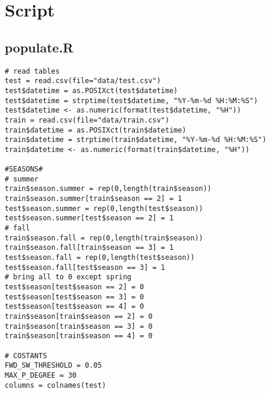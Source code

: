 \section{Script}\label{sec:script}

\subsection{populate.R}\label{sec:script-populate}
\begin{verbatim}
# read tables
test = read.csv(file="data/test.csv")
test$datetime = as.POSIXct(test$datetime)
test$datetime = strptime(test$datetime, "%Y-%m-%d %H:%M:%S")
test$datetime <- as.numeric(format(test$datetime, "%H"))
train = read.csv(file="data/train.csv")
train$datetime = as.POSIXct(train$datetime)
train$datetime = strptime(train$datetime, "%Y-%m-%d %H:%M:%S")
train$datetime <- as.numeric(format(train$datetime, "%H"))

#SEASONS#
# summer
train$season.summer = rep(0,length(train$season))
train$season.summer[train$season == 2] = 1
test$season.summer = rep(0,length(test$season))
test$season.summer[test$season == 2] = 1
# fall
train$season.fall = rep(0,length(train$season))
train$season.fall[train$season == 3] = 1
test$season.fall = rep(0,length(test$season))
test$season.fall[test$season == 3] = 1
# bring all to 0 except spring
test$season[test$season == 2] = 0
test$season[test$season == 3] = 0
test$season[test$season == 4] = 0
train$season[train$season == 2] = 0
train$season[train$season == 3] = 0
train$season[train$season == 4] = 0

# COSTANTS
FWD_SW_THRESHOLD = 0.05
MAX_P_DEGREE = 30
columns = colnames(test)
\end{verbatim}
